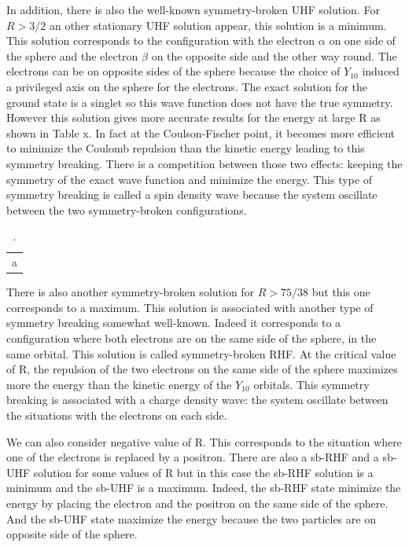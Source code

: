 \documentclass[11pt,a4paper]{article}
\begin{document}
In addition, there is also the well-known symmetry-broken UHF solution. For $R>3/2$ an other stationary UHF solution appear, this solution is a minimum. This solution corresponds to the configuration with the electron $\alpha$ on one side of the sphere and the electron $\beta$ on the opposite side and the other way round. The electrons can be on opposite sides of the sphere because the choice of $Y_{10}$ induced a privileged axis on the sphere for the electrons. The exact solution for the ground state is a singlet so this wave function does not have the true symmetry. However this solution gives more accurate results for the energy at large R as shown in Table x. In fact at the Coulson-Fischer point, it becomes more efficient to minimize the Coulomb repulsion than the kinetic energy leading to this symmetry breaking. There is a competition between those two effects: keeping the symmetry of the exact wave function and minimize the energy. This type of symmetry breaking is called a spin density wave because the system oscillate between the two symmetry-broken configurations.

\begin{table}[h!]
\centering
\begin{tabular}{c}
a
\end{tabular}
    \caption{\centering .}
\label{tab:ERHFvsEUHF}
\end{table}

There is also another symmetry-broken solution for $R>75/38$ but this one corresponds to a maximum. This solution is associated with another type of symmetry breaking somewhat well-known. Indeed it corresponds to a configuration where both electrons are on the same side of the sphere, in the same orbital. This solution is called symmetry-broken RHF. At the critical value of R, the repulsion of the two electrons on the same side of the sphere maximizes more the energy than the kinetic energy of the $Y_{10}$ orbitals. This symmetry breaking is associated with a charge density wave: the system oscillate between the situations with the electrons on each side.

We can also consider negative value of R. This corresponds to the situation where one of the electrons is replaced by a positron. There are also a sb-RHF and a sb-UHF solution for some values of R but in this case the sb-RHF solution is a minimum and the sb-UHF is a maximum. Indeed, the sb-RHF state minimize the energy by placing the electron and the positron on the same side of the sphere. And the sb-UHF state maximize the energy because the two particles are on opposite side of the sphere.
\end{document}
